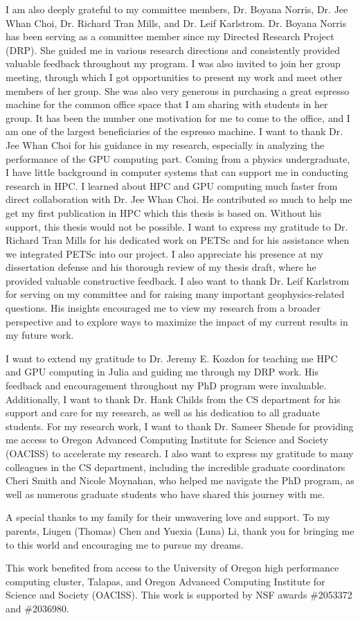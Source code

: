 {	I am also deeply grateful to my committee members, Dr. Boyana Norris, Dr. Jee Whan Choi, Dr. Richard Tran Mills, and Dr. Leif Karlstrom. Dr. Boyana Norris has been serving as a committee member since my Directed Research Project (DRP). 
	She guided me in various research directions and consistently provided valuable feedback throughout my program. I was also invited to join her group meeting, through which I got opportunities to present my work and meet other members of her group.
	She was also very generous in purchasing a great espresso machine for the common office space that I am sharing with students in her group. 
	It has been the number one motivation for me to come to the office, and I am one of the largest beneficiaries of the espresso machine.
	I want to thank Dr. Jee Whan Choi for his guidance in my research, especially in analyzing the performance of the GPU computing part. Coming from a physics undergraduate, I have little background in computer systems that can support me in conducting research in HPC. I learned about HPC and GPU computing much faster from direct collaboration with Dr. Jee Whan Choi. He contributed so much to help me get my first publication in HPC which this thesis is based on. Without his support, this thesis would not be possible.
	I want to express my gratitude to Dr. Richard Tran Mills for his dedicated work on PETSc and for his assistance when we integrated PETSc into our project. I also appreciate his presence at my dissertation defense and his thorough review of my thesis draft, where he provided valuable constructive feedback.
	I also want to thank Dr. Leif Karlstrom for serving on my committee and for raising many important geophysics-related questions. His insights encouraged me to view my research from a broader perspective and to explore ways to maximize the impact of my current results in my future work.


	I want to extend my gratitude to Dr. Jeremy E. Kozdon for teaching me HPC and GPU computing in Julia and guiding me through my DRP work. His feedback and encouragement throughout my PhD program were invaluable. Additionally, I want to thank Dr. Hank Childs from the CS department for his support and care for my research, as well as his dedication to all graduate students. For my research work, I want to thank Dr. Sameer Shende for providing me access to Oregon Advanced Computing Institute for Science and Society (OACISS) to accelerate my research. 
	I also want to express my gratitude to many colleagues in the CS department, including the incredible graduate coordinators Cheri Smith and Nicole Moynahan, who helped me navigate the PhD program, as well as numerous graduate students who have shared this journey with me.

	A special thanks to my family for their unwavering love and support. To my parents, Liugen (Thomas) Chen and Yuexia (Luna) Li, thank you for bringing me to this world and encouraging me to pursue my dreams. 

	This work benefited from access to the University of Oregon high performance computing cluster, Talapas, and Oregon Advanced Computing Institute for Science and Society (OACISS). This work is supported by NSF awards \#2053372 and \#2036980. 
}

